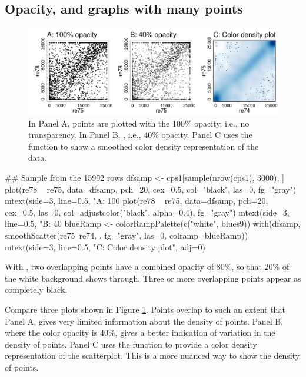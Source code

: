 \subsection*{Opacity, and graphs with many points}\label{ss:xpoint}

\begin{figure}
\begin{Schunk}


\centerline{\includegraphics[width=\textwidth]{figs/07-alpha-ex-1} }

\end{Schunk}
\caption{In Panel A, points are plotted with the 100\% opacity, i.e.,
  no transparency. In Panel B, , i.e., 40\% opacity.
  Panel C uses the function  to show a smoothed
  color density representation of the data.\label{fig:alpha}}
\end{figure}

\noindent
\begin{Schunk}
\begin{Sinput}
## Sample from the 15992 rows
dfsamp <- cps1[sample(nrow(cps1), 3000), ]
plot(re78 ~ re75, data=dfsamp, pch=20, cex=0.5,
     col="black", las=0, fg="gray")
mtext(side=3, line=0.5, "A: 100%
plot(re78 ~ re75, data=dfsamp, pch=20, cex=0.5, las=0,
     col=adjustcolor("black", alpha=0.4), fg="gray")
mtext(side=3, line=0.5, "B: 40%
blueRamp <- colorRampPalette(c("white", blues9))
with(dfsamp, smoothScatter(re75~re74, , fg="gray",
                           las=0, colramp=blueRamp))
mtext(side=3, line=0.5, "C: Color density plot",
      adj=0)
\end{Sinput}
\end{Schunk}
With , two overlapping points have a combined
opacity of 80\%, so that 20\% of the white background shows through.
Three or more overlapping points appear as completely black.

  Compare
three plots shown in Figure \ref{fig:alpha}.  Points overlap to such
an extent that Panel A, gives very limited information about the
density of points.  Panel B, where the color opacity is 40\%, gives a
better indication of variation in the density of points.  Panel C uses
the function  to provide a color density
representation of the scatterplot.  This is a more nuanced
way to show the density of points.

